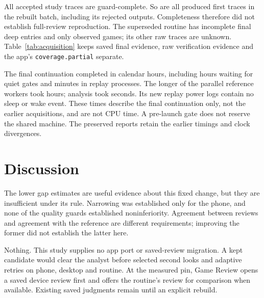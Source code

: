 \documentclass[11pt]{article}
\begin{document}
All accepted study traces are guard-complete. So are all produced first
traces in the rebuilt batch, including its rejected outputs. Completeness
therefore did not establish full-review reproduction. The superseded routine
has \OriginalIncomplete{} incomplete final deep entries and only
\OriginalObserved{} observed games; its other \OriginalMissing{} raw traces
are unknown. Table~\ref{tab:acquisition} keeps saved final evidence, raw
verification evidence and the app's \texttt{coverage.partial} separate.

\begin{table}[ht]
\centering\AcquisitionTable
\caption{Incomplete evidence before and after the routine rebuild. The
superseded batch is excluded from the comparison. Unknown is not zero.}
\label{tab:acquisition}
\end{table}

The final continuation completed in \ContinuationHours{} calendar hours,
including \QuietHours{} hours waiting for quiet gates and
\ReplayMinutes{} minutes in replay processes. The longer of the
\ReferenceWorkers{} parallel reference workers took \ReferenceHours{} hours;
analysis took \AnalysisSeconds{} seconds. Its new replay power logs contain
no sleep or wake event. These times describe the final continuation only,
not the earlier acquisitions, and are not CPU time. A pre-launch gate does
not reserve the shared machine. The preserved reports retain the earlier
timings and clock divergences.

\section{Discussion}
The lower gap estimates are useful evidence about this fixed change, but
they are insufficient under its rule. Narrowing was established only for
the phone, and none of the quality guards established noninferiority.
Agreement between reviews and agreement with the reference are different
requirements; improving the former did not establish the latter here.

Nothing. This study supplies no app port or saved-review migration. A kept
candidate would clear the analyst before selected second looks and adaptive
retries on phone, desktop and routine. At the measured pin, Game Review opens
a saved device review first and offers the routine's review for comparison
when available. Existing saved judgments remain until an explicit rebuild.
\end{document}
